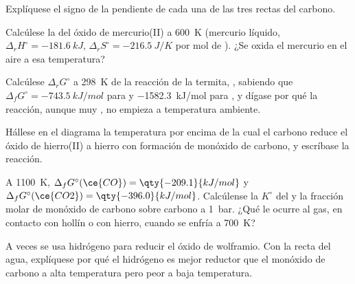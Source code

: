 \begin{exercise}[$\star$]\label{exo:b2:ellingham:4}
Explíquese el signo de la pendiente de cada una de las tres rectas del carbono.
\end{exercise}

\begin{exercise}[$\star\star$]\label{exo:b2:ellingham:5}
Calcúlese la  del óxido de mercurio(II) a \qty{600}{K}
(mercurio líquido, $\Delta_r H^\circ = \qty{-181.6}{kJ}$, $\Delta_r S^\circ =
\qty{-216.5}{J/K}$ por mol de ). ¿Se oxida el mercurio en el aire a esa
temperatura?
\end{exercise}

\begin{exercise}[$\star\star$]\label{exo:b2:ellingham:6}
Calcúlese $\Delta_r G^\circ$ a \qty{298}{K} de la reacción de la termita, , sabiendo que $\Delta_f G^\circ = \qty{-743.5}{kJ/mol}$ para
 y \qty{-1582.3}{kJ/mol} para , y dígase por qué la reacción,
aunque muy , no empieza a temperatura ambiente.
\end{exercise}

\begin{exercise}[$\star\star$]\label{exo:b2:ellingham:7}
Hállese en el diagrama la temperatura por encima de la cual el carbono reduce el óxido de hierro(II)
a hierro con formación de monóxido de carbono, y escríbase la reacción.
\end{exercise}

\begin{exercise}[$\star\star$]\label{exo:b2:ellingham:8}
A \qty{1100}{K}, $\Delta_f G^\circ(\ce{CO}) = \qty{-209.1}{kJ/mol}$ y
$\Delta_f G^\circ(\ce{CO2}) = \qty{-396.0}{kJ/mol}$. Calcúlense la $K^\circ$ del
 y la fracción molar de monóxido de carbono sobre carbono a
\qty{1}{bar}. ¿Qué le ocurre al gas, en contacto con hollín o con hierro, cuando se
enfría a \qty{700}{K}?
\end{exercise}

\begin{exercise}[$\star\star$]\label{exo:b2:ellingham:9}
A veces se usa hidrógeno para reducir el óxido de wolframio. Con la recta del agua,
explíquese por qué el hidrógeno es mejor reductor que el monóxido de carbono a alta
temperatura pero peor a baja temperatura.
\end{exercise}

